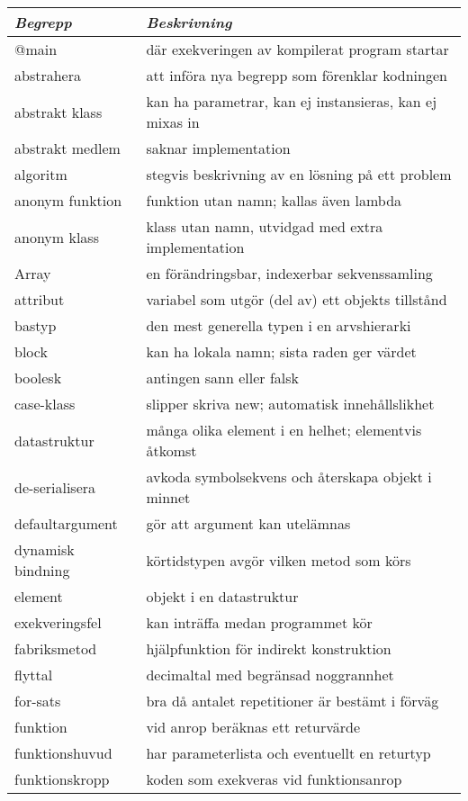 \begin{tabular}{l|l}
\textit{Begrepp} & \textit{Beskrivning} \\ \hline \hline
@main & där exekveringen av kompilerat program startar \\
abstrahera & att införa nya begrepp som förenklar kodningen \\
abstrakt klass & kan ha parametrar, kan ej instansieras, kan ej mixas in \\
abstrakt medlem & saknar implementation \\
algoritm & stegvis beskrivning av en lösning på ett problem \\
anonym funktion & funktion utan namn; kallas även lambda \\
anonym klass & klass utan namn, utvidgad med extra implementation \\
Array & en förändringsbar, indexerbar sekvenssamling \\
attribut & variabel som utgör (del av) ett objekts tillstånd \\
bastyp & den mest generella typen i en arvshierarki \\
block & kan ha lokala namn; sista raden ger värdet \\
boolesk & antingen sann eller falsk \\
case-klass & slipper skriva new; automatisk innehållslikhet \\
datastruktur & många olika element i en helhet; elementvis åtkomst \\
de-serialisera & avkoda symbolsekvens och återskapa objekt i minnet \\
defaultargument & gör att argument kan utelämnas \\
dynamisk bindning & körtidstypen avgör vilken metod som körs \\
element & objekt i en datastruktur \\
exekveringsfel & kan inträffa medan programmet kör \\
fabriksmetod & hjälpfunktion för indirekt konstruktion \\
flyttal & decimaltal med begränsad noggrannhet \\
for-sats & bra då antalet repetitioner är bestämt i förväg \\
funktion & vid anrop beräknas ett returvärde \\
funktionshuvud & har parameterlista och eventuellt en returtyp \\
funktionskropp & koden som exekveras vid funktionsanrop \\

\end{tabular}
